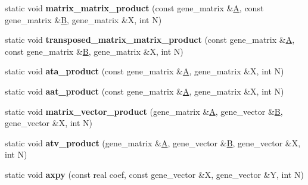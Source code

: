 \begin{DoxyCompactItemize}
static void {\bfseries matrix\+\_\+matrix\+\_\+product} (const gene\+\_\+matrix \&\hyperlink{group___core___module_class_eigen_1_1_matrix}{A}, const gene\+\_\+matrix \&\hyperlink{group___core___module_class_eigen_1_1_matrix}{B}, gene\+\_\+matrix \&X, int N)
\item 
\mbox{\label{classblaze__interface_a069c8f5a97adf1cf38df109cfc52adcd}} 
static void {\bfseries transposed\+\_\+matrix\+\_\+matrix\+\_\+product} (const gene\+\_\+matrix \&\hyperlink{group___core___module_class_eigen_1_1_matrix}{A}, const gene\+\_\+matrix \&\hyperlink{group___core___module_class_eigen_1_1_matrix}{B}, gene\+\_\+matrix \&X, int N)
\item 
\mbox{\label{classblaze__interface_a138a096e3117f9e0f019583e061c0ade}} 
static void {\bfseries ata\+\_\+product} (const gene\+\_\+matrix \&\hyperlink{group___core___module_class_eigen_1_1_matrix}{A}, gene\+\_\+matrix \&X, int N)
\item 
\mbox{\label{classblaze__interface_a462cadf053dad7bc327dfd4568b95cd9}} 
static void {\bfseries aat\+\_\+product} (const gene\+\_\+matrix \&\hyperlink{group___core___module_class_eigen_1_1_matrix}{A}, gene\+\_\+matrix \&X, int N)
\item 
\mbox{\label{classblaze__interface_a8c291c5e17cc5f67604a1f913ce185d4}} 
static void {\bfseries matrix\+\_\+vector\+\_\+product} (gene\+\_\+matrix \&\hyperlink{group___core___module_class_eigen_1_1_matrix}{A}, gene\+\_\+vector \&\hyperlink{group___core___module_class_eigen_1_1_matrix}{B}, gene\+\_\+vector \&X, int N)
\item 
\mbox{\label{classblaze__interface_a376d27a47f9518236ed739cabaa802e8}} 
static void {\bfseries atv\+\_\+product} (gene\+\_\+matrix \&\hyperlink{group___core___module_class_eigen_1_1_matrix}{A}, gene\+\_\+vector \&\hyperlink{group___core___module_class_eigen_1_1_matrix}{B}, gene\+\_\+vector \&X, int N)
\item 
\mbox{\label{classblaze__interface_a92bfe236825df0b75f072d994d63cf21}} 
static void {\bfseries axpy} (const real coef, const gene\+\_\+vector \&X, gene\+\_\+vector \&Y, int N)
\item 

\end{DoxyCompactItemize}

